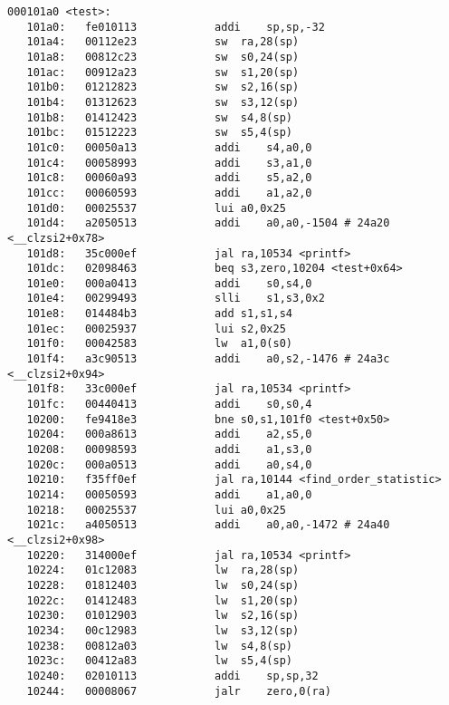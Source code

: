 \begin{Verbatim}[breaklines=true]
000101a0 <test>:
   101a0:	fe010113          	addi	sp,sp,-32
   101a4:	00112e23          	sw	ra,28(sp)
   101a8:	00812c23          	sw	s0,24(sp)
   101ac:	00912a23          	sw	s1,20(sp)
   101b0:	01212823          	sw	s2,16(sp)
   101b4:	01312623          	sw	s3,12(sp)
   101b8:	01412423          	sw	s4,8(sp)
   101bc:	01512223          	sw	s5,4(sp)
   101c0:	00050a13          	addi	s4,a0,0
   101c4:	00058993          	addi	s3,a1,0
   101c8:	00060a93          	addi	s5,a2,0
   101cc:	00060593          	addi	a1,a2,0
   101d0:	00025537          	lui	a0,0x25
   101d4:	a2050513          	addi	a0,a0,-1504 # 24a20 <__clzsi2+0x78>
   101d8:	35c000ef          	jal	ra,10534 <printf>
   101dc:	02098463          	beq	s3,zero,10204 <test+0x64>
   101e0:	000a0413          	addi	s0,s4,0
   101e4:	00299493          	slli	s1,s3,0x2
   101e8:	014484b3          	add	s1,s1,s4
   101ec:	00025937          	lui	s2,0x25
   101f0:	00042583          	lw	a1,0(s0)
   101f4:	a3c90513          	addi	a0,s2,-1476 # 24a3c <__clzsi2+0x94>
   101f8:	33c000ef          	jal	ra,10534 <printf>
   101fc:	00440413          	addi	s0,s0,4
   10200:	fe9418e3          	bne	s0,s1,101f0 <test+0x50>
   10204:	000a8613          	addi	a2,s5,0
   10208:	00098593          	addi	a1,s3,0
   1020c:	000a0513          	addi	a0,s4,0
   10210:	f35ff0ef          	jal	ra,10144 <find_order_statistic>
   10214:	00050593          	addi	a1,a0,0
   10218:	00025537          	lui	a0,0x25
   1021c:	a4050513          	addi	a0,a0,-1472 # 24a40 <__clzsi2+0x98>
   10220:	314000ef          	jal	ra,10534 <printf>
   10224:	01c12083          	lw	ra,28(sp)
   10228:	01812403          	lw	s0,24(sp)
   1022c:	01412483          	lw	s1,20(sp)
   10230:	01012903          	lw	s2,16(sp)
   10234:	00c12983          	lw	s3,12(sp)
   10238:	00812a03          	lw	s4,8(sp)
   1023c:	00412a83          	lw	s5,4(sp)
   10240:	02010113          	addi	sp,sp,32
   10244:	00008067          	jalr	zero,0(ra)


\end{Verbatim}
